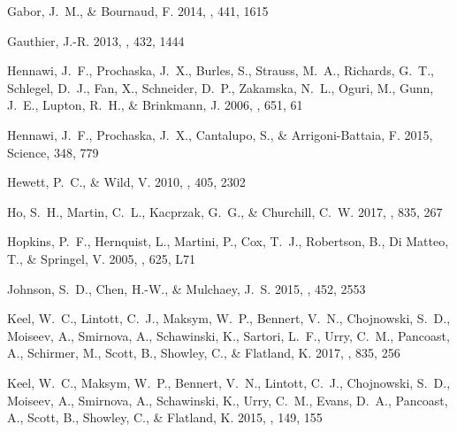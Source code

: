 \documentclass[iop]{emulateapj}
\begin{document}
\begin{thebibliography}{52}
{Gabor}, J.~M., \& {Bournaud}, F. 2014, \mnras, 441, 1615

{Gauthier}, J.-R. 2013, \mnras, 432, 1444

{Hennawi}, J.~F., {Prochaska}, J.~X., {Burles}, S., {Strauss}, M.~A.,
  {Richards}, G.~T., {Schlegel}, D.~J., {Fan}, X., {Schneider}, D.~P.,
  {Zakamska}, N.~L., {Oguri}, M., {Gunn}, J.~E., {Lupton}, R.~H., \&
  {Brinkmann}, J. 2006, \apj, 651, 61

{Hennawi}, J.~F., {Prochaska}, J.~X., {Cantalupo}, S., \& {Arrigoni-Battaia},
  F. 2015, Science, 348, 779

{Hewett}, P.~C., \& {Wild}, V. 2010, \mnras, 405, 2302

{Ho}, S.~H., {Martin}, C.~L., {Kacprzak}, G.~G., \& {Churchill}, C.~W. 2017,
  \apj, 835, 267

{Hopkins}, P.~F., {Hernquist}, L., {Martini}, P., {Cox}, T.~J., {Robertson},
  B., {Di Matteo}, T., \& {Springel}, V. 2005, \apjl, 625, L71

{Johnson}, S.~D., {Chen}, H.-W., \& {Mulchaey}, J.~S. 2015, \mnras, 452, 2553

{Keel}, W.~C., {Lintott}, C.~J., {Maksym}, W.~P., {Bennert}, V.~N.,
  {Chojnowski}, S.~D., {Moiseev}, A., {Smirnova}, A., {Schawinski}, K.,
  {Sartori}, L.~F., {Urry}, C.~M., {Pancoast}, A., {Schirmer}, M., {Scott}, B.,
  {Showley}, C., \& {Flatland}, K. 2017, \apj, 835, 256

{Keel}, W.~C., {Maksym}, W.~P., {Bennert}, V.~N., {Lintott}, C.~J.,
  {Chojnowski}, S.~D., {Moiseev}, A., {Smirnova}, A., {Schawinski}, K., {Urry},
  C.~M., {Evans}, D.~A., {Pancoast}, A., {Scott}, B., {Showley}, C., \&
  {Flatland}, K. 2015, \aj, 149, 155


\end{thebibliography}
\end{document}

